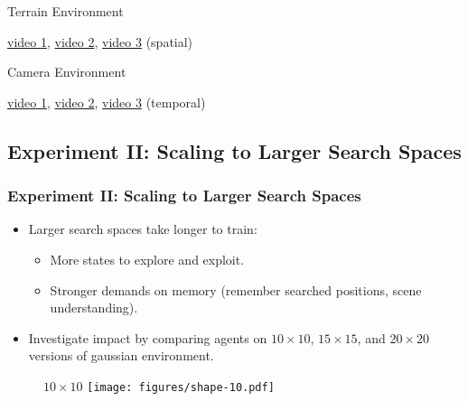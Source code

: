 \begin{frame}
    \begin{table}
        \centering
        Terrain Environment\par\vspace{0.5em}
        
    \end{table}

    \centering \href{run:videos/terrain/map/0.gif}{video 1}, \href{run:videos/terrain/map/0.gif}{video 2}, \href{run:videos/terrain/map/2.gif}{video 3} (spatial)
\end{frame}

\begin{frame}
    \begin{table}
        \centering
        Camera Environment\par\vspace{0.5em}
        
    \end{table}

    \centering \href{run:videos/camera/lstm/0.gif}{video 1}, \href{run:videos/camera/lstm/0.gif}{video 2}, \href{run:videos/camera/lstm/2.gif}{video 3} (temporal)
\end{frame}

\subsection{Experiment II: Scaling to Larger Search Spaces}

\begin{frame}
    \frametitle{Experiment II: Scaling to Larger Search Spaces}

    \begin{itemize}
        \item Larger search spaces take longer to train:
        \begin{itemize}
            \item More states to explore and exploit.
            \item Stronger demands on memory (remember searched positions, scene understanding).
        \end{itemize}
        \item Investigate impact by comparing agents on \(10 \times 10\), \(15 \times 15\), and \(20 \times 20\) versions of gaussian environment.
    \end{itemize}
\end{frame}

\begin{frame}
    \begin{figure}
        \centering
        \(10 \times 10\)
        \texttt{[image: figures/shape-10.pdf]}
    \end{figure}
\end{frame}

